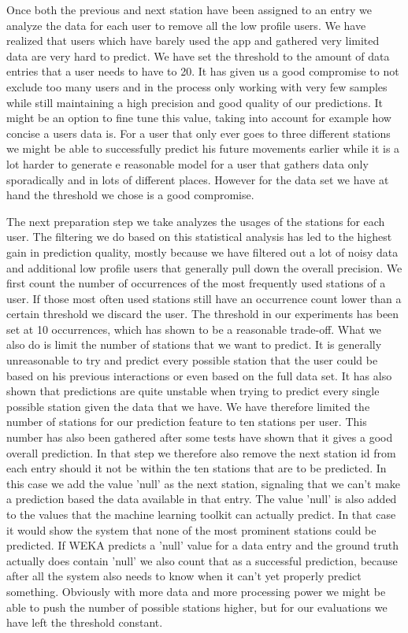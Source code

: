 Once both the previous and next station have been assigned to an entry we analyze the data for each user to remove all the low profile users. We have realized that users which have barely used the app and gathered very limited data are very hard to predict. We have set the threshold to the amount of data entries that a user needs to have to 20. It has given us a good compromise to not exclude too many users and in the process only working with very few samples while still maintaining a high precision and good quality of our predictions. It might be an option to fine tune this value, taking into account for example how concise a users data is. For a user that only ever goes to three different stations we might be able to successfully predict his future movements earlier while it is a lot harder to generate e reasonable model for a user that gathers data only sporadically and in lots of different places. However for the data set we have at hand the threshold we chose is a good compromise.

\label{subsec:station_usage}
The next preparation step we take analyzes the usages of the stations for each user. The filtering we do based on this statistical analysis has led to the highest gain in prediction quality, mostly because we have filtered out a lot of noisy data and additional low profile users that generally pull down the overall precision. We first count the number of occurrences of the most frequently used stations of a user. If those most often used stations still have an occurrence count lower than a certain threshold we discard the user. The threshold in our experiments has been set at 10 occurrences, which has shown to be a reasonable trade-off. 
What we also do is limit the number of stations that we want to predict. It is generally unreasonable to try and predict every possible station that the user could be based on his previous interactions or even based on the full data set. It has also shown that predictions are quite unstable when trying to predict every single possible station given the data that we have. We have therefore limited the number of stations for our prediction feature to ten stations per user. This number has also been gathered after some tests have shown that it gives a good overall prediction. In that step we therefore also remove the next station id from each entry should it not be within the ten stations that are to be predicted. In this case we add the value 'null' as the next station, signaling that we can't make a prediction based the data available in that entry. The value 'null' is also added to the values that the machine learning toolkit can actually predict. In that case it would show the system that none of the most prominent stations could be predicted. If WEKA predicts a 'null' value for a data entry and the ground truth actually does contain 'null' we also count that as a successful prediction, because after all the system also needs to know when it can't yet properly predict something. Obviously with more data and more processing power we might be able to push the number of possible stations higher, but for our evaluations we have left the threshold constant.

